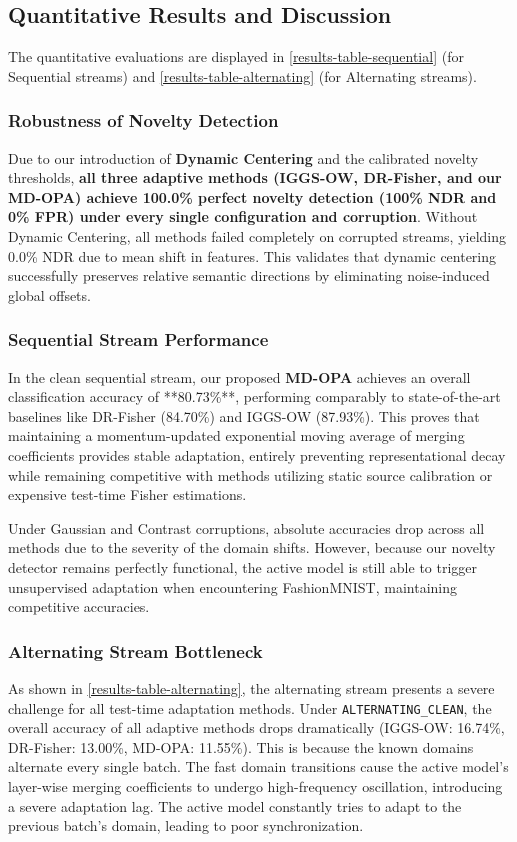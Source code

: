 \documentclass{article}
\theoremstyle{plain}
\theoremstyle{definition}
\theoremstyle{remark}
\begin{document}
\subsection{Quantitative Results and Discussion}
The quantitative evaluations are displayed in \cref{results-table-sequential} (for Sequential streams) and \cref{results-table-alternating} (for Alternating streams).

\subsubsection{Robustness of Novelty Detection}
Due to our introduction of \textbf{Dynamic Centering} and the calibrated novelty thresholds, \textbf{all three adaptive methods (IGGS-OW, DR-Fisher, and our MD-OPA) achieve 100.0\% perfect novelty detection (100\% NDR and 0\% FPR) under every single configuration and corruption}. Without Dynamic Centering, all methods failed completely on corrupted streams, yielding 0.0\% NDR due to mean shift in features. This validates that dynamic centering successfully preserves relative semantic directions by eliminating noise-induced global offsets.

\subsubsection{Sequential Stream Performance}
In the clean sequential stream, our proposed \textbf{MD-OPA} achieves an overall classification accuracy of **80.73\%**, performing comparably to state-of-the-art baselines like DR-Fisher (84.70\%) and IGGS-OW (87.93\%). This proves that maintaining a momentum-updated exponential moving average of merging coefficients provides stable adaptation, entirely preventing representational decay while remaining competitive with methods utilizing static source calibration or expensive test-time Fisher estimations.

Under Gaussian and Contrast corruptions, absolute accuracies drop across all methods due to the severity of the domain shifts. However, because our novelty detector remains perfectly functional, the active model is still able to trigger unsupervised adaptation when encountering FashionMNIST, maintaining competitive accuracies.

\subsubsection{Alternating Stream Bottleneck}
As shown in \cref{results-table-alternating}, the alternating stream presents a severe challenge for all test-time adaptation methods. Under \texttt{ALTERNATING\_CLEAN}, the overall accuracy of all adaptive methods drops dramatically (IGGS-OW: 16.74\%, DR-Fisher: 13.00\%, MD-OPA: 11.55\%). This is because the known domains alternate every single batch. The fast domain transitions cause the active model's layer-wise merging coefficients to undergo high-frequency oscillation, introducing a severe adaptation lag. The active model constantly tries to adapt to the previous batch's domain, leading to poor synchronization.
\end{document}
